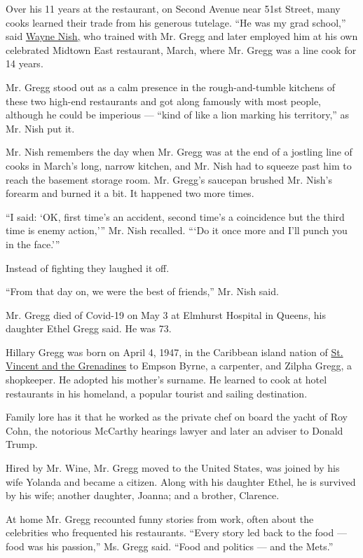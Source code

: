 Over his 11 years at the restaurant, on Second Avenue near 51st Street,
many cooks learned their trade from his generous tutelage. ``He was my
grad school,'' said
\href{https://dinersjournal.blogs.nytimes.com/2009/02/09/nish-has-left-the-country/}{Wayne
Nish,} who trained with Mr. Gregg and later employed him at his own
celebrated Midtown East restaurant, March, where Mr. Gregg was a line
cook for 14 years.

Mr. Gregg stood out as a calm presence in the rough-and-tumble kitchens
of these two high-end restaurants and got along famously with most
people, although he could be imperious --- ``kind of like a lion marking
his territory,'' as Mr. Nish put it.

Mr. Nish remembers the day when Mr. Gregg was at the end of a jostling
line of cooks in March's long, narrow kitchen, and Mr. Nish had to
squeeze past him to reach the basement storage room. Mr. Gregg's
saucepan brushed Mr. Nish's forearm and burned it a bit. It happened two
more times.

``I said: `OK, first time's an accident, second time's a coincidence but
the third time is enemy action,''' Mr. Nish recalled. ```Do it once more
and I'll punch you in the face.'''

Instead of fighting they laughed it off.

``From that day on, we were the best of friends,'' Mr. Nish said.

Mr. Gregg died of Covid-19 on May 3 at Elmhurst Hospital in Queens, his
daughter Ethel Gregg said. He was 73.

Hillary Gregg was born on April 4, 1947, in the Caribbean island nation
of
\href{https://www.nytimes.com/topic/destination/saint-vincent-and-the-grenadines}{St.
Vincent and the Grenadines} to Empson Byrne, a carpenter, and Zilpha
Gregg, a shopkeeper. He adopted his mother's surname. He learned to cook
at hotel restaurants in his homeland, a popular tourist and sailing
destination.

Family lore has it that he worked as the private chef on board the yacht
of Roy Cohn, the notorious McCarthy hearings lawyer and later an adviser
to Donald Trump.

Hired by Mr. Wine, Mr. Gregg moved to the United States, was joined by
his wife Yolanda and became a citizen. Along with his daughter Ethel, he
is survived by his wife; another daughter, Joanna; and a brother,
Clarence.

At home Mr. Gregg recounted funny stories from work, often about the
celebrities who frequented his restaurants. ``Every story led back to
the food --- food was his passion,'' Ms. Gregg said. ``Food and politics
--- and the Mets.''

